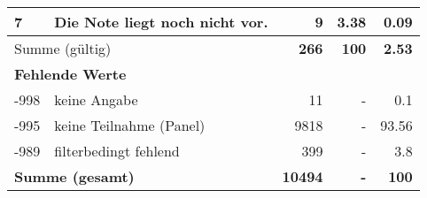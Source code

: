\begin{longtable}{lXrrr}
     7 &
     \multicolumn{1}{X}{ Die Note liegt noch nicht vor.   } &


       \num{9} &
       \num[round-mode=places,round-precision=2]{3.38} &
         \num[round-mode=places,round-precision=2]{0.09} \\
     \midrule
     \multicolumn{2}{l}{Summe (gültig)} &
       \textbf{\num{266}} &
     \textbf{\num{100}} &
       \textbf{\num[round-mode=places,round-precision=2]{2.53}} \\
     \multicolumn{5}{l}{\textbf{Fehlende Werte}}\\
       -998 &
       keine Angabe &
         \num{11} &
        - &
         \num[round-mode=places,round-precision=2]{0.1} \\
       -995 &
       keine Teilnahme (Panel) &
         \num{9818} &
        - &
         \num[round-mode=places,round-precision=2]{93.56} \\
       -989 &
       filterbedingt fehlend &
         \num{399} &
        - &
         \num[round-mode=places,round-precision=2]{3.8} \\
     \midrule
     \multicolumn{2}{l}{\textbf{Summe (gesamt)}} &
          \textbf{\num{10494}} &
        \textbf{-} &
        \textbf{\num{100}} \\
     \bottomrule
     \end{longtable}
     
